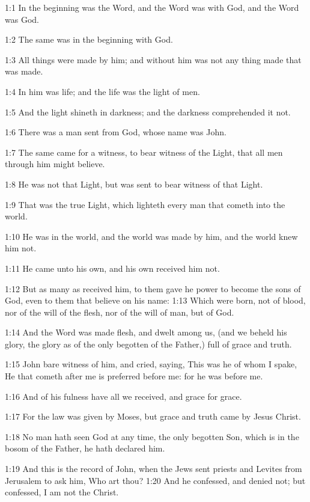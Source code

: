 

1:1 In the beginning was the Word, and the Word was with God, and the Word was God.

1:2 The same was in the beginning with God.

1:3 All things were made by him; and without him was not any thing made that was made.

1:4 In him was life; and the life was the light of men.

1:5 And the light shineth in darkness; and the darkness comprehended it not.

1:6 There was a man sent from God, whose name was John.

1:7 The same came for a witness, to bear witness of the Light, that all men through him might believe.

1:8 He was not that Light, but was sent to bear witness of that Light.

1:9 That was the true Light, which lighteth every man that cometh into the world.

1:10 He was in the world, and the world was made by him, and the world knew him not.

1:11 He came unto his own, and his own received him not.

1:12 But as many as received him, to them gave he power to become the sons of God, even to them that believe on his name: 1:13 Which were born, not of blood, nor of the will of the flesh, nor of the will of man, but of God.

1:14 And the Word was made flesh, and dwelt among us, (and we beheld his glory, the glory as of the only begotten of the Father,) full of grace and truth.

1:15 John bare witness of him, and cried, saying, This was he of whom I spake, He that cometh after me is preferred before me: for he was before me.

1:16 And of his fulness have all we received, and grace for grace.

1:17 For the law was given by Moses, but grace and truth came by Jesus Christ.

1:18 No man hath seen God at any time, the only begotten Son, which is in the bosom of the Father, he hath declared him.

1:19 And this is the record of John, when the Jews sent priests and Levites from Jerusalem to ask him, Who art thou?  1:20 And he confessed, and denied not; but confessed, I am not the Christ.

